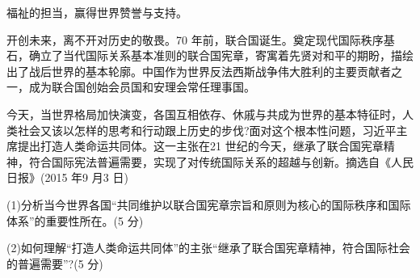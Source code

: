 \documentclass[UTF8,11pt]{ctexart}
\begin{document}
福祉的担当，赢得世界赞誉与支持。

开创未来，离不开对历史的敬畏。70 年前，联合国诞生。奠定现代国际秩序基石，确立了当代国际关系基本准则的联合国宪章，寄寓着先贤对和平的期盼，描绘出了战后世界的基本轮廓。中国作为世界反法西斯战争伟大胜利的主要贡献者之一，成为联合国创始会员国和安理会常任理事国。

今天，当世界格局加快演变，各国互相依存、休戚与共成为世界的基本特征时，人类社会又该以怎样的思考和行动跟上历史的步伐?面对这个根本性问题，习近平主席提出打造人类命运共同体。这一主张在21 世纪的今天，继承了联合国宪章精神，符合国际宪法普遍需要，实现了对传统国际关系的超越与创新。摘选自《人民日报》(2015 年9 月3 日)

(1)分析当今世界各国“共同维护以联合国宪章宗旨和原则为核心的国际秩序和国际体系”的重要性所在。(5 分)


(2)如何理解“打造人类命运共同体”的主张“继承了联合国宪章精神，符合国际社会的普遍需要”?(5 分)
\end{document}
